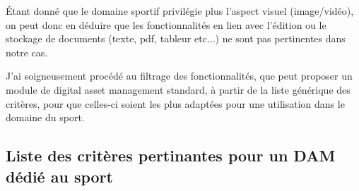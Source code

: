 Étant donné que le domaine sportif privilégie plus l'aspect visuel (image/vidéo), on peut donc en déduire que les fonctionnalités en lien avec l'édition ou le stockage de documents (texte, pdf, tableur etc...) ne sont pas pertinentes dans notre cas.


J'ai soigneusement procédé au filtrage des fonctionnalités, que peut proposer un module de digital asset management standard, à partir de la liste générique des critères, pour que celles-ci soient les plus adaptées pour une utilisation dans le domaine du sport.

\subsection{Liste des critères pertinantes pour un DAM dédié au sport}


